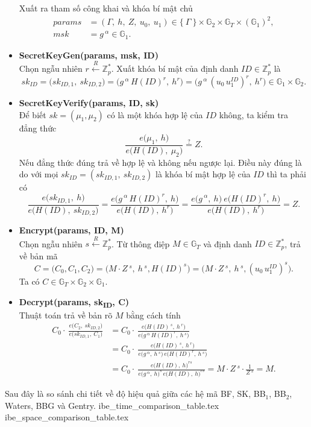 \documentclass[class=report, crop=false]{standalone}
\begin{document}
\begin{itemize}[leftmargin=1cm, itemindent=-1cm]
			Xuất ra tham số công khai và khóa bí mật chủ
			\begin{align*}
				params &= (\Gamma,\ h,\ Z,\ u_0,\ u_1) \in \{\ \Gamma \ \} \times \mathbb{G}_2 \times \mathbb{G}_T \times (\mathbb{G}_1)^2, \\
				msk &= g\,^\alpha \in \mathbb{G}_1.
			\end{align*}
			\item[] {\sffamily\bfseries SecretKeyGen(params, msk, ID)} \\
			Chọn ngẫu nhiên $r \xleftarrow{R} \mathbb{Z}_p^*$. Xuất khóa bí mật của định danh $ID \in \mathbb{Z}_p^*$ là
			\[
				sk_{ID} = \Big(sk_{ID, 1},\ sk_{ID, 2} \Big) = \Big(g\,^\alpha\, H(ID)^r,\ h^r \Big) = \Big(g\,^\alpha\, (u_0 \, u_1^{ID})^r,\ h^r \Big) \in \mathbb{G}_1 \times \mathbb{G}_2.
			\]
			\item[] {\sffamily\bfseries SecretKeyVerify(params, ID, sk)} \\
			Để biết $sk = (\mu_1, \mu_2)$ có là một khóa hợp lệ của $ID$ không, ta kiểm tra đẳng thức
			\[
				\frac{e \Big(\mu_1,\ h \Big)}{e \Big(H(ID),\ \mu_2 \Big)} \overset{?}{=} Z.
			\]
			Nếu đẳng thức đúng trả về hợp lệ và không nếu ngược lại. Điều này đúng là do với mọi $sk_{ID} = (sk_{ID, 1},\ sk_{ID, 2})$ là khóa bí mật hợp lệ của $ID$ thì ta phải có
			\[
				\frac{e \Big(sk_{ID, 1},\ h \Big)}{e \Big(H(ID),\ sk_{ID, 2} \Big)} =
				\frac{e \Big(g\,^\alpha\, H(ID)^r,\ h \Big)}{e \Big(H(ID),\ h^r \Big)} =
				\frac{e \Big(g\,^\alpha,\ h \Big)\ e \Big(H(ID)^r,\ h \Big)}{e \Big(H(ID),\ h^r \Big)} = Z.
			\]
			\item[] {\sffamily\bfseries Encrypt(params, ID, M)} \\
			Chọn ngẫu nhiên $s \xleftarrow{R} \mathbb{Z}_p^*$. Từ thông điệp $M \in \mathbb{G}_T$ và định danh $ID \in \mathbb{Z}_p^*$, trả về bản mã
			\[
				C = \Big(C_0, C_1, C_2 \Big) = \Big(M \cdot Z\,^s,\ h\,^s, H(ID)^s \Big) = \Big(M \cdot Z\,^s,\ h\,^s, (u_0 \, u_1^{ID})^s \Big).
			\]
			Ta có $C \in \mathbb{G}_T \times \mathbb{G}_2 \times \mathbb{G}_1$.
			\item[] {\sffamily\bfseries Decrypt(params, sk\textsubscript{ID}, C)} \\
			Thuật toán trả về bản rõ $M$ bằng cách tính
			\begin{align*}
				C_0 \cdot\ \frac{e \Big(C_2,\ sk_{ID, 2} \Big)}{e \Big(sk_{ID, 1},\ C_1 \Big)} &=
				C_0 \cdot\ \frac{e \Big(H(ID)\,^s,\ h\,^r \Big)}{e \Big(g\,^\alpha\, H(ID)^r,\ h\,^s \Big)} \\ &=
				C_0 \cdot\ \frac{e \Big(H(ID)\,^s,\ h\,^r \Big)}{e \Big(g\,^\alpha,\ h\,^s \Big)\, e \Big(H(ID)^r,\ h\,^s \Big)} \\ &=
				C_0 \cdot\ \frac{e \Big(H(ID),\ h \Big)^{rs}}{e \Big(g\,^\alpha,\ h \Big)^s\, e \Big(H(ID),\ h \Big)^{rs}} = M \cdot Z\,^s \cdot \frac{1}{Z\,^s} = M.
			\end{align*}
		\end{itemize}
		Sau đây là so sánh chi tiết về độ hiệu quả giữa các hệ mã BF, SK, BB$_1$, BB$_2$, Waters, BBG và Gentry.
		{ibe_time_comparison_table.tex}
		\newpage
		{ibe_space_comparison_table.tex}
	\newpage
\end{document}
